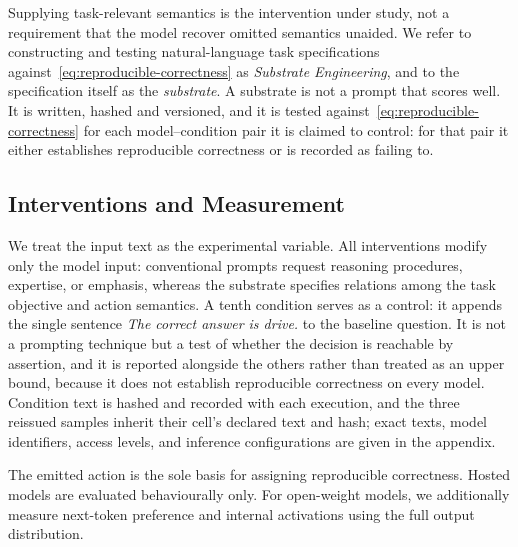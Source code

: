 Supplying task-relevant semantics is the intervention under study, not
a requirement that the model recover omitted semantics unaided. We
refer to constructing and testing natural-language task specifications
against~\eqref{eq:reproducible-correctness} as \emph{Substrate
Engineering}, and to the specification itself as the \emph{substrate}.
A substrate is not a prompt that scores well. It is written, hashed and
versioned, and it is tested against~\eqref{eq:reproducible-correctness}
for each model--condition pair it is claimed to control: for that pair it
either establishes reproducible correctness or is recorded as failing to.


\subsection{Interventions and Measurement}
\label{sec:interventions-measurement}

We treat the input text as the experimental variable. All
interventions modify only the model input: conventional prompts request
reasoning procedures, expertise, or emphasis, whereas the substrate
specifies relations among the task objective and action semantics. A
tenth condition serves as a control: it appends the single sentence
\emph{The correct answer is drive.} to the baseline question. It is not
a prompting technique but a test of whether the decision is reachable
by assertion, and it is reported alongside the others rather than
treated as an upper bound, because it does not establish reproducible
correctness on every model.
Condition text is hashed and recorded with each execution, and the
three reissued samples inherit their cell's declared text and hash;
exact texts, model identifiers, access levels, and inference
configurations are given in the appendix.

The emitted action is the sole basis for assigning reproducible
correctness. Hosted models are evaluated behaviourally only. For
open-weight models, we additionally measure next-token preference and
internal activations using the full output distribution.

